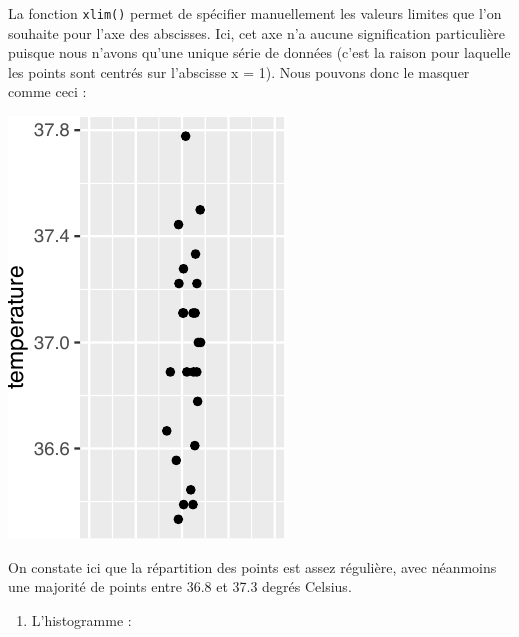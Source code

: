 \documentclass[
  a4paper,
]{article}
\newenvironment{Shaded}{\begin{snugshade}}{\end{snugshade}}
\newcommand{\DataTypeTok}[1]{\textcolor[rgb]{0.00,0.34,0.68}{#1}}
\newcommand{\DecValTok}[1]{\textcolor[rgb]{0.69,0.50,0.00}{#1}}
\newcommand{\FloatTok}[1]{\textcolor[rgb]{0.69,0.50,0.00}{#1}}
\newcommand{\KeywordTok}[1]{\textcolor[rgb]{0.12,0.11,0.11}{\textbf{#1}}}
\newcommand{\NormalTok}[1]{\textcolor[rgb]{0.12,0.11,0.11}{#1}}
\newcommand{\OperatorTok}[1]{\textcolor[rgb]{0.12,0.11,0.11}{#1}}
\newcommand{\StringTok}[1]{\textcolor[rgb]{0.75,0.01,0.01}{#1}}
\providecommand{\tightlist}{%
  \setlength{\itemsep}{0pt}\setlength{\parskip}{0pt}}
\begin{document}
La fonction \texttt{xlim()} permet de spécifier manuellement les valeurs limites que l'on souhaite pour l'axe des abscisses. Ici, cet axe n'a aucune signification particulière puisque nous n'avons qu'une unique série de données (c'est la raison pour laquelle les points sont centrés sur l'abscisse x = 1). Nous pouvons donc le masquer comme ceci :

\begin{Shaded}
\end{Shaded}

\begin{center}\includegraphics[width=0.25\linewidth]{figure/unnamed-chunk-17-1} \end{center}

On constate ici que la répartition des points est assez régulière, avec néanmoins une majorité de points entre 36.8 et 37.3 degrés Celsius.

\begin{enumerate}
\def\labelenumi{\arabic{enumi}.}
\setcounter{enumi}{1}
\tightlist
\item
  L'histogramme :
\end{enumerate}
\end{document}
